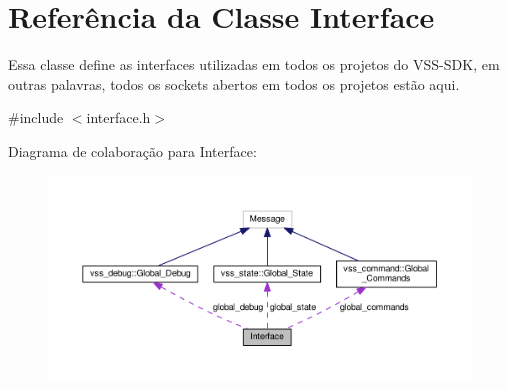 \hypertarget{classInterface}{}\section{Referência da Classe Interface}
\label{classInterface}


Essa classe define as interfaces utilizadas em todos os projetos do V\+S\+S-\/\+S\+DK, em outras palavras, todos os sockets abertos em todos os projetos estão aqui.  




{\ttfamily \#include $<$interface.\+h$>$}



Diagrama de colaboração para Interface\+:\nopagebreak
\begin{figure}[H]
\begin{center}
\leavevmode
\includegraphics[width=350pt]{classInterface__coll__graph}
\end{center}
\end{figure}
